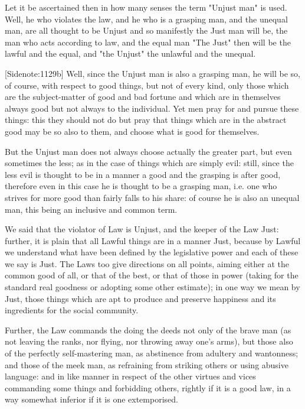 Let it be ascertained then in how many senses the term "Unjust man" is
used. Well, he who violates the law, and he who is a grasping man, and
the unequal man, are all thought to be Unjust and so manifestly the Just
man will be, the man who acts according to law, and the equal man "The
Just" then will be the lawful and the equal, and "the Unjust" the
unlawful and the unequal.

[Sidenote:1129b] Well, since the Unjust man is also a grasping man, he
will be so, of course, with respect to good things, but not of every
kind, only those which are the subject-matter of good and bad fortune
and which are in themselves always good but not always to the
individual. Yet men pray for and pursue these things: this they should
not do but pray that things which are in the abstract good may be so
also to them, and choose what is good for themselves.

But the Unjust man does not always choose actually the greater part, but
even sometimes the less; as in the case of things which are simply evil:
still, since the less evil is thought to be in a manner a good and the
grasping is after good, therefore even in this case he is thought to be
a grasping man, i.e. one who strives for more good than fairly falls to
his share: of course he is also an unequal man, this being an inclusive
and common term.

We said that the violator of Law is Unjust, and the keeper of the Law
Just: further, it is plain that all Lawful things are in a manner
Just, because by Lawful we understand what have been defined by the
legislative power and each of these we say is Just. The Laws too give
directions on all points, aiming either at the common good of all, or
that of the best, or that of those in power (taking for the standard
real goodness or adopting some other estimate); in one way we mean by
Just, those things which are apt to produce and preserve happiness and
its ingredients for the social community.

Further, the Law commands the doing the deeds not only of the brave man
(as not leaving the ranks, nor flying, nor throwing away one's arms),
but those also of the perfectly self-mastering man, as abstinence from
adultery and wantonness; and those of the meek man, as refraining from
striking others or using abusive language: and in like manner in respect
of the other virtues and vices commanding some things and forbidding
others, rightly if it is a good law, in a way somewhat inferior if it is
one extemporised.

